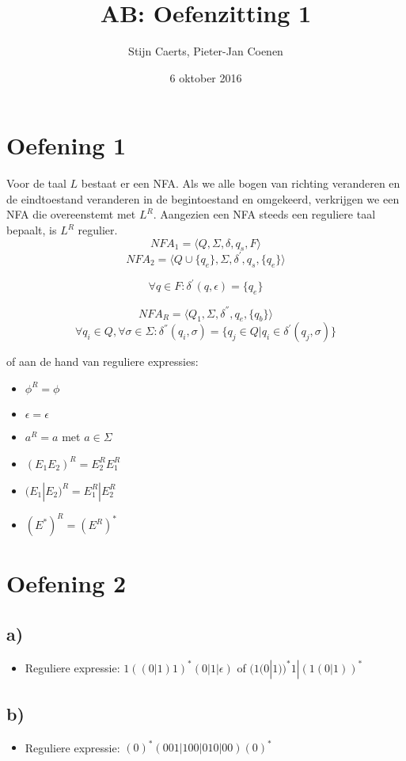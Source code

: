 \documentclass[12pt]{article}
\title{AB: Oefenzitting 1}
\author{Stijn Caerts, Pieter-Jan Coenen}
\date{6 oktober 2016}
\begin{document}
    \maketitle
    
    \section{Oefening 1}
    Voor de taal $L$ bestaat er een NFA. Als we alle bogen van richting veranderen en de eindtoestand veranderen in de begintoestand en omgekeerd, verkrijgen we een NFA die overeenstemt met $L^{R}$. Aangezien een NFA steeds een reguliere taal bepaalt, is $L^{R}$ regulier. 
    $$ NFA_1 = \langle Q, \Sigma, \delta, q_s, F \rangle $$
    $$ NFA_2 = \langle Q \cup \{ q_e \}, \Sigma, \delta^{'}, q_s, \{q_e\} \rangle $$
    
    $$ \forall q \in F: \delta^{'}(q,\epsilon) = \{q_e\} $$
    
    $$ NFA_R = \langle Q_1, \Sigma, \delta^{''}, q_e, \{q_b\} \rangle $$
    $$ \forall q_i \in Q, \forall \sigma \in \Sigma: \delta^{''}(q_i,\sigma) = \{q_j \in Q | q_i \in \delta^{'}(q_j,\sigma)\} $$
    
    of aan de hand van reguliere expressies:
    \begin{itemize}
	\item $ \phi^R = \phi $
	\item $ \epsilon = \epsilon $
	\item $ a^R = a $ met $ a \in \Sigma $
	\item $ (E_1 E_2)^R = E_2^R E_1^R $
	\item $ (E_1 | E_2)^R = E_1^R | E_2^R $
	\item $ (E^*)^R = (E^R)^* $
    \end{itemize}

    
    
    \section{Oefening 2}
    \subsection{a)}
    \begin{itemize}
        \item Reguliere expressie: $ 1 ((0|1)1)^{*} (0|1|\epsilon) $ of $ (1(0|1))^{*} 1 | (1(0|1))^{*} $
    \end{itemize}
    
    \subsection{b)}
    \begin{itemize}
        \item Reguliere expressie: $ (0)^{*} (001|100|010|00) (0)^{*} $
    \end{itemize}
    
\end{document}
